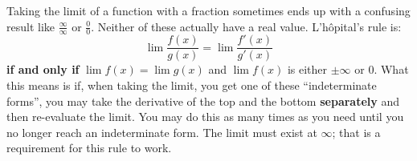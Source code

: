 \documentclass[../revisedmain.tex]{subfiles}
\begin{document}
	Taking the limit of a function with a fraction sometimes ends up with a confusing result like $\displaystyle\frac{\infty}{\infty}$ or $\displaystyle\frac{0}{0}$. Neither of these actually have a real value. L'h\^opital's rule is:$$\lim\frac{f(x)}{g(x)}=\lim\frac{f'(x)}{g'(x)}$$ \textbf{if and only if} $\lim f(x)= \lim g(x)$ and $\lim f(x)$ is either $\pm\infty$ or 0. What this means is if, when taking the limit, you get one of these ``indeterminate forms'', you may take the derivative of the top and the bottom \textbf{separately} and then re-evaluate the limit. You may do this as many times as you need until you no longer reach an indeterminate form. The limit must exist at $\infty$; that is a requirement for this rule to work.\\
\end{document}
